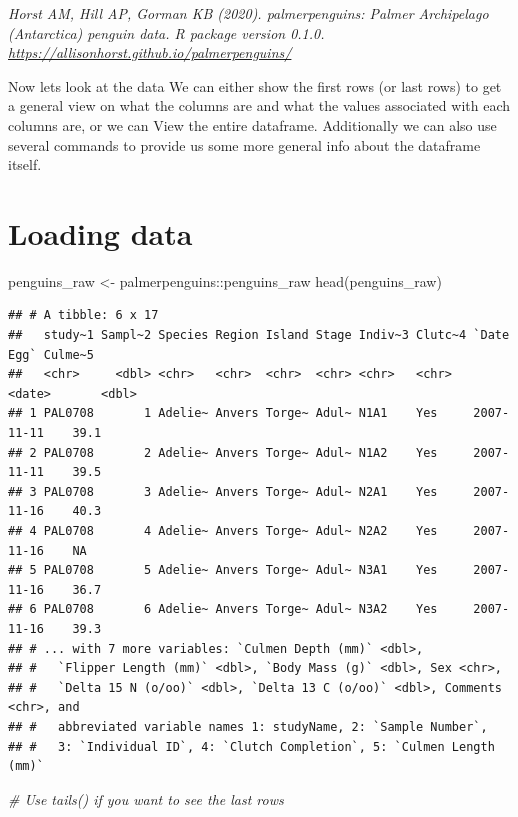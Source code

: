 \documentclass[
]{book}
\newenvironment{Shaded}{\begin{snugshade}}{\end{snugshade}}
\newcommand{\CommentTok}[1]{\textcolor[rgb]{0.56,0.35,0.01}{\textit{#1}}}
\newcommand{\FunctionTok}[1]{\textcolor[rgb]{0.00,0.00,0.00}{#1}}
\newcommand{\NormalTok}[1]{#1}
\newcommand{\OtherTok}[1]{\textcolor[rgb]{0.56,0.35,0.01}{#1}}
\newcommand{\SpecialCharTok}[1]{\textcolor[rgb]{0.00,0.00,0.00}{#1}}
\begin{document}
\emph{Horst AM, Hill AP, Gorman KB (2020). palmerpenguins: Palmer Archipelago (Antarctica) penguin data. R package version 0.1.0. \url{https://allisonhorst.github.io/palmerpenguins/}}

Now lets look at the data We can either show the first rows (or last rows) to get a general view on what the columns are and what the values associated with each columns are, or we can View the entire dataframe.
Additionally we can also use several commands to provide us some more general info about the dataframe itself.

\hypertarget{loading-data}{%
\section{Loading data}\label{loading-data}}

\begin{Shaded}
\begin{Highlighting}[]
\NormalTok{penguins\_raw }\OtherTok{\textless{}{-}}\NormalTok{ palmerpenguins}\SpecialCharTok{::}\NormalTok{penguins\_raw}
\FunctionTok{head}\NormalTok{(penguins\_raw)}
\end{Highlighting}
\end{Shaded}

\begin{verbatim}
## # A tibble: 6 x 17
##   study~1 Sampl~2 Species Region Island Stage Indiv~3 Clutc~4 `Date Egg` Culme~5
##   <chr>     <dbl> <chr>   <chr>  <chr>  <chr> <chr>   <chr>   <date>       <dbl>
## 1 PAL0708       1 Adelie~ Anvers Torge~ Adul~ N1A1    Yes     2007-11-11    39.1
## 2 PAL0708       2 Adelie~ Anvers Torge~ Adul~ N1A2    Yes     2007-11-11    39.5
## 3 PAL0708       3 Adelie~ Anvers Torge~ Adul~ N2A1    Yes     2007-11-16    40.3
## 4 PAL0708       4 Adelie~ Anvers Torge~ Adul~ N2A2    Yes     2007-11-16    NA  
## 5 PAL0708       5 Adelie~ Anvers Torge~ Adul~ N3A1    Yes     2007-11-16    36.7
## 6 PAL0708       6 Adelie~ Anvers Torge~ Adul~ N3A2    Yes     2007-11-16    39.3
## # ... with 7 more variables: `Culmen Depth (mm)` <dbl>,
## #   `Flipper Length (mm)` <dbl>, `Body Mass (g)` <dbl>, Sex <chr>,
## #   `Delta 15 N (o/oo)` <dbl>, `Delta 13 C (o/oo)` <dbl>, Comments <chr>, and
## #   abbreviated variable names 1: studyName, 2: `Sample Number`,
## #   3: `Individual ID`, 4: `Clutch Completion`, 5: `Culmen Length (mm)`
\end{verbatim}

\begin{Shaded}
\begin{Highlighting}[]
\CommentTok{\# Use tails() if you want to see the last rows}
\end{Highlighting}
\end{Shaded}
\end{document}
